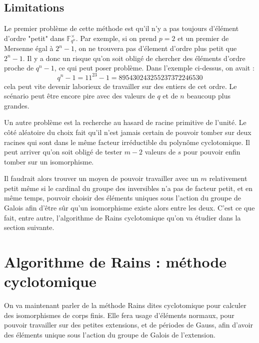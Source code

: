 \documentclass[a4paper]{article} %
\numberwithin{section}{part}
\numberwithin{equation}{section}
\newcommand\GF[1]{\mathbb{F}_{#1}}
\begin{document}
\subsection{Limitations}
Le premier problème de cette méthode est qu'il n'y a pas toujours d'élément
d'ordre "petit" dans $\GF{q^n}^{\times}$. Par exemple, si on prend $p = 2$ et un
premier de Mersenne égal à $2^n - 1$, on ne trouvera pas d'élement d'ordre plus
petit que $2^n - 1$. Il y a donc un risque qu'on soit obligé de chercher des
éléments d'ordre proche de $q^n - 1$, ce qui peut poser problème. Dans l'exemple
ci-dessus, on avait :
\[q^n - 1 = 11^{23} - 1 = 895430243255237372246530\]
cela peut vite devenir laborieux de travailler sur des entiers de cet ordre. Le
scénario peut être encore pire avec des valeurs de $q$ et de $n$ beaucoup plus
grandes.\par
Un autre problème est la recherche au hasard de racine primitive de l'unité. Le
côté aléatoire du choix fait qu'il n'est jamais certain de pouvoir tomber sur
deux racines qui sont dans le même facteur irréductible du polynôme
cyclotomique. Il peut arriver qu'on soit obligé de tester $m-2$ valeurs de $s$
pour pouvoir enfin tomber sur un isomorphisme.\par
Il faudrait alors trouver un moyen de pouvoir travailler avec un $m$
relativement petit même si le cardinal  du groupe des inversibles n'a pas de
facteur petit, et en même temps, pouvoir choisir des éléments uniques sous
l'action du groupe de Galois afin d'être sûr qu'un isomorphisme existe alors
entre les deux. C'est ce que fait, entre autre, l'algorithme de Rains 
cyclotomique qu'on va étudier dans la section suivante.


\section{Algorithme de Rains : méthode cyclotomique}
On va maintenant parler de la méthode Rains dites cyclotomique pour calculer des
isomorphismes de corps finis. Elle fera usage d'éléments normaux, pour pouvoir
travailler sur des petites extensions, et de périodes de Gauss, afin d'avoir des
éléments unique sous l'action du groupe de Galois de l'extension.
\end{document}
